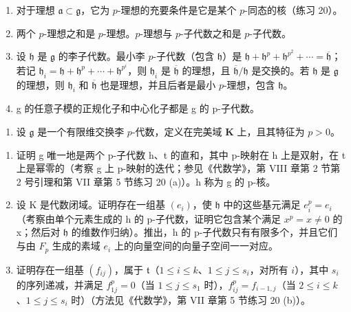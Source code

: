 \begin{enumerate}
\def\labelenumi{(\alph{enumi})}
\item
对于理想 \(\mathfrak{a} \subset \mathfrak{g}\)，它为 \(p\)-理想的充要条件是它是某个 \(p\)-同态的核（练习 20）。
\item
两个 \(p\)-理想之和是 \(p\)-理想。\(p\)-理想与 \(p\)-子代数之和是 \(p\)-子代数。
\item
设 \(\mathfrak{h}\) 是 \(\mathfrak{g}\) 的李子代数。最小李 \(p\)-子代数（包含 \(\mathfrak{h}\)）是 \(\mathfrak{h} + \mathfrak{h}^p + \mathfrak{h}^{p^2} + \cdots = \overline{\mathfrak{h}}\)；若记 \(\mathfrak{h}_i = \mathfrak{h} + \mathfrak{h}^p + \cdots + \mathfrak{h}^{p^i}\)，则 \(\mathfrak{h}_i\) 是 \(\overline{\mathfrak{h}}\) 的理想，且 \(\overline{\mathfrak{h}}/\mathfrak{h}\) 是交换的。若 \(\mathfrak{h}\) 是 \(\mathfrak{g}\) 的理想，则 \(\mathfrak{h}_i\) 和 \(\overline{\mathfrak{h}}\) 也是理想，并且后者是最小 \(p\)-理想，包含 \(\mathfrak{h}\)。
\item
  g 的任意子模的正规化子和中心化子都是 g 的 p-子代数。
\end{enumerate}

\begin{enumerate}
\def\labelenumi{\arabic{enumi}.}
\setcounter{enumi}{22}
\tightlist
\item
设 \(\mathfrak{g}\) 是一个有限维交换李 \(p\)-代数，定义在完美域 \(\mathbf{K}\) 上，且其特征为 \(p > 0\)。
\end{enumerate}

\begin{enumerate}
\def\labelenumi{(\alph{enumi})}
\item
  证明 g 唯一地是两个 p-子代数 h、t 的直和，其中 p-映射在 h 上是双射，在 t 上是幂零的（考察 g 上 p-映射的迭代；参见《代数学》，第 VIII 章第 2 节第 2 号引理和第 VII 章第 5 节练习 20 (a)）。h 称为 g 的 p-核。
\item
  设 K 是代数闭域。证明存在一组基 \((e_{i})\)，使 \(\mathfrak{h}\) 中的这些基元满足 \(e_{i}^{p}=e_{i}\)（考察由单个元素生成的 h 的 p-子代数，证明它包含某个满足 \(x^{p}=x\neq0\) 的 x；然后对 \(\mathfrak{h}\) 的维数作归纳）。推出，h 的 p-子代数只有有限多个，并且它们与由 \(F_{p}\) 生成的素域 \(e_{i}\) 上的向量空间的向量子空间一一对应。
\item
证明存在一组基 \((f_{ij})\)，属于 \(\mathfrak{t}\)（\(1 \leqslant i \leqslant k\)、\(1 \leqslant j \leqslant s_i\)，对所有 \(i\)），其中 \(s_i\) 的序列递减，并满足 \(f_{1j}^p = 0\)（当 \(1 \leqslant j \leqslant s_1\) 时），\(f_{ij}^p = f_{i-1,j}\)（当 \(2 \leqslant i \leqslant k\)、\(1 \leqslant j \leqslant s_i\) 时）（方法见《代数学》，第 VII 章第 5 节练习 20 (b)）。
\end{enumerate}

